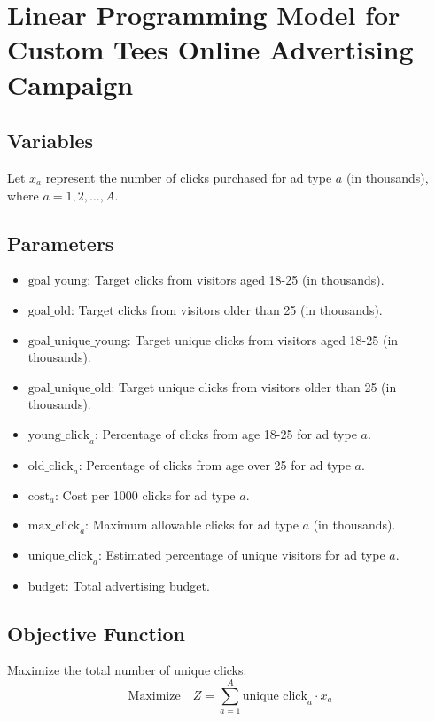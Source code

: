 \documentclass{article}
\begin{document}
\section*{Linear Programming Model for Custom Tees Online Advertising Campaign}

\subsection*{Variables}
Let \( x_a \) represent the number of clicks purchased for ad type \( a \) (in thousands), where \( a = 1, 2, \ldots, A \).

\subsection*{Parameters}
\begin{itemize}
    \item \( \text{goal\_young} \): Target clicks from visitors aged 18-25 (in thousands).
    \item \( \text{goal\_old} \): Target clicks from visitors older than 25 (in thousands).
    \item \( \text{goal\_unique\_young} \): Target unique clicks from visitors aged 18-25 (in thousands).
    \item \( \text{goal\_unique\_old} \): Target unique clicks from visitors older than 25 (in thousands).
    \item \( \text{young\_click}_a \): Percentage of clicks from age 18-25 for ad type \( a \).
    \item \( \text{old\_click}_a \): Percentage of clicks from age over 25 for ad type \( a \).
    \item \( \text{cost}_a \): Cost per 1000 clicks for ad type \( a \).
    \item \( \text{max\_click}_a \): Maximum allowable clicks for ad type \( a \) (in thousands).
    \item \( \text{unique\_click}_a \): Estimated percentage of unique visitors for ad type \( a \).
    \item \( \text{budget} \): Total advertising budget.
\end{itemize}

\subsection*{Objective Function}
Maximize the total number of unique clicks:
\[
\text{Maximize} \quad Z = \sum_{a=1}^{A} \text{unique\_click}_a \cdot x_a
\]
\end{document}
